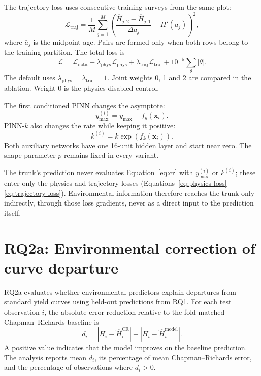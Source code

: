 \documentclass[logo,msc,ai]{infthesis}           %
\begin{document}
The trajectory loss uses consecutive training surveys from the same plot:
\begin{equation}
\mathcal{L}_{\mathrm{traj}}=\frac{1}{M}\sum_{j=1}^{M}
\left(\frac{\hat H_{j,2}-\hat H_{j,1}}{\Delta a_j}-H'(\bar a_j)\right)^2,
\label{eq:trajectory-loss}
\end{equation}
where $\bar a_j$ is the midpoint age. Pairs are formed only when both rows belong to the training
partition. The total loss is
\begin{equation}
\mathcal{L}=\mathcal{L}_{\mathrm{data}}+
\lambda_{\mathrm{phys}}\mathcal{L}_{\mathrm{phys}}+
\lambda_{\mathrm{traj}}\mathcal{L}_{\mathrm{traj}}+
10^{-5}\sum_{\theta}|\theta|.
\label{eq:total-loss}
\end{equation}
The default uses $\lambda_{\mathrm{phys}}=\lambda_{\mathrm{traj}}=1$. Joint weights 0, 1 and 2
are compared in the ablation. Weight 0 is the physics-disabled control.

The first conditioned PINN changes the asymptote:
\begin{equation}
y_{\max}^{(i)}=y_{\max}+f_y(\mathbf{x}_i).
\label{eq:ymax-adjust}
\end{equation}
PINN-$k$ also changes the rate while keeping it positive:
\begin{equation}
k^{(i)}=k\exp\!\left(f_k(\mathbf{x}_i)\right).
\label{eq:k-adjust}
\end{equation}
Both auxiliary networks have one 16-unit hidden layer and start near zero. The shape parameter
$p$ remains fixed in every variant.

The trunk's prediction never evaluates Equation~\ref{eq:cr} with $y_{\max}^{(i)}$ or $k^{(i)}$;
these enter only the physics and trajectory losses (Equations~\ref{eq:physics-loss}--
\ref{eq:trajectory-loss}). Environmental information therefore reaches the trunk only indirectly,
through those loss gradients, never as a direct input to the prediction itself.

\section{RQ2a: Environmental correction of curve departure}

RQ2a evaluates whether environmental predictors explain departures from standard yield curves using held-out predictions from RQ1. For each test observation $i$, the absolute error reduction relative to the fold-matched Chapman--Richards baseline is
\begin{equation}
d_i=\left|H_i-\hat H_i^{\mathrm{CR}}\right|-
\left|H_i-\hat H_i^{\mathrm{model}}\right|.
\label{eq:residual-reduction}
\end{equation}
A positive value indicates that the model improves on the baseline prediction. The analysis reports mean $d_i$, its percentage of mean Chapman--Richards error, and the percentage of observations where $d_i>0$.
\end{document}
